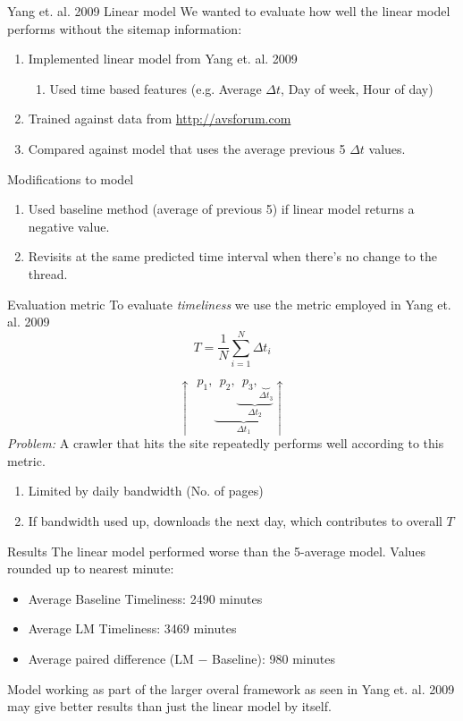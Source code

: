 \documentclass[compress]{beamer}
\begin{document}
\begin{frame}{Yang et. al. 2009 Linear model}
	We wanted to evaluate how well the linear model performs without the sitemap information:
	\begin{enumerate}
		\item Implemented linear model from Yang et. al. 2009
			\begin{enumerate}
				\item Used time based features (e.g. Average $\Delta t$, Day of week, Hour of day)
			\end{enumerate}
		\item Trained against data from \url{http://avsforum.com}
		\item Compared against model that uses the average previous 5 $\Delta t$ values.
	\end{enumerate}
\end{frame}

\begin{frame}{Modifications to model}
	\begin{enumerate}
		\item Used baseline method (average of previous 5) if linear model returns a negative value.
		\item Revisits at the same predicted time interval when there's no change to the thread.
	\end{enumerate}
\end{frame}
\begin{frame}{Evaluation metric}
To evaluate \emph{timeliness} we use the metric employed in Yang et. al. 2009
\[
	T = \frac{1}{N} \sum^{N}_{i=1}\Delta t_i
\]
\end{frame}
\begin{frame}
\[
	\uparrow~~p_1,\underbrace{~~p_2,\underbrace{~~p_3,\underbrace{~~}_{\Delta t_3}}_{\Delta t_2}}_{\Delta t_1}\uparrow
\]
\textit{Problem:} A crawler that hits the site repeatedly performs well according to this metric.
\begin{enumerate}
	\item Limited by daily bandwidth (No. of pages)
	\item If bandwidth used up, downloads the next day, which contributes to overall $T$
\end{enumerate}
\end{frame}


\begin{frame}{Results}
	The linear model performed worse than the 5-average model. Values rounded up to nearest minute:
	\begin{itemize}
		\item Average Baseline Timeliness: 2490 minutes
		\item Average LM Timeliness: 3469 minutes
		\item Average paired difference (LM $-$ Baseline): 980 minutes
	\end{itemize}
	Model working as part of the larger overal framework as seen in Yang et. al. 2009 may give better results than just the linear model by itself.
\end{frame}
\end{document}
